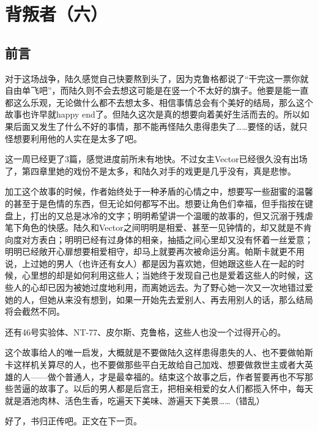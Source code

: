 \chapter{背叛者（六）}

\section*{前言}
对于这场战争，陆久感觉自己快要熬到头了，因为克鲁格都说了“干完这一票你就自由单飞吧”，而陆久则不会去想这可能是在竖一个不太好的旗子。他要是能一直都这么乐观，无论做什么都不去想太多、相信事情总会有个美好的结局，那么这个故事也许早就happy end了。但陆久这次是真的想要向着美好生活而去的。所以如果后面又发生了什么不好的事情，那不能再怪陆久患得患失了……要怪的话，就只怪想要利用他的人实在是太多了吧。

\lineseparator


这一周已经更了3篇，感觉进度前所未有地快。不过女主Vector已经很久没有出场了，第四章里她的戏份不是太多，和陆久对手的戏更是几乎没有，真是悲惨。

加工这个故事的时候，作者始终处于一种矛盾的心情之中，想要写一些甜蜜的温馨的甚至于是色情的东西，但无论如何都写不出。想要让角色们幸福，但手指按在键盘上，打出的又总是冰冷的文字；明明希望讲一个温暖的故事的，但又沉溺于残虐笔下角色的快感。陆久和Vector之间明明是相爱、甚至一见钟情的，却又就是不肯向度对方表白；明明已经有过身体的相亲，抽插之间心里却又没有怀着一丝爱意；明明已经敞开心扉想要相爱相守，却马上就要再次被命运分离。帕斯卡就更不用说，上过她的男人（也许还有女人）都是因为喜欢她，但她跟这些人在一起的时候，心里想的却是如何利用这些人；当她终于发现自己也是爱着这些人的时候，这些人的心却已因为被她过度地利用，而离她远去。为了野心她一次又一次地错过爱她的人，但她从来没有想到，如果一开始先去爱别人、再去用别人的话，那么结局将会截然不同。

还有46号实验体、NT-77、皮尔斯、克鲁格，这些人也没一个过得开心的。

这个故事给人的唯一启发，大概就是不要做陆久这样患得患失的人、也不要做帕斯卡这样机关算尽的人，也不要做那些平白无故给自己加戏、想要做救世主或者大英雄的人——做个普通人，才是最幸福的。结束这个故事之后，作者誓要再也不写那些苦逼的故事了。以后的男人都是后宫王，把相亲相爱的女人们都揽入怀中，每天就是酒池肉林、活色生香，吃遍天下美味、游遍天下美景……（错乱）

好了，书归正传吧。正文在下一页。

\section*{}

